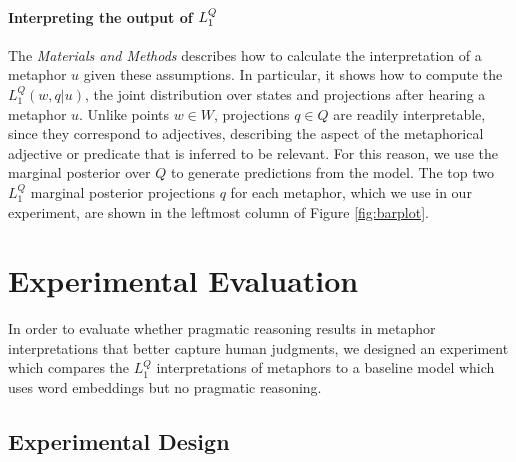 \documentclass[9pt,twocolumn,twoside,lineno]{pnas-new}
\newcommand{\Listener}{L}
\newcommand{\QLONE}{\Listener_{{1}}^{{Q}}}
\begin{document}
\paragraph{Interpreting the output of $\protect\QLONE$}

	The \emph{Materials and Methods} describes how to calculate the interpretation of a metaphor $u$ given these assumptions. In particular, it shows how to compute the $\QLONE(w,q|u)$, the joint distribution over states and projections after hearing a metaphor $u$. Unlike points $w\in W$, projections $q\in Q$ are readily interpretable, since they correspond to adjectives, describing the aspect of the metaphorical adjective or predicate that is inferred to be relevant.
	For this reason, we use the marginal posterior over $Q$ to generate predictions from the model. The top two $\QLONE$ marginal posterior projections $q$ for each metaphor, which we use in our experiment, are shown in the leftmost column of Figure \ref{fig:barplot}. 





\section{Experimental Evaluation} \label{exp}

	In order to evaluate whether pragmatic reasoning results in metaphor interpretations that better capture human judgments, we designed an experiment which compares the $\QLONE$ interpretations of metaphors to a baseline model which uses word embeddings but no pragmatic reasoning.


	\subsection*{Experimental Design}
\end{document}
